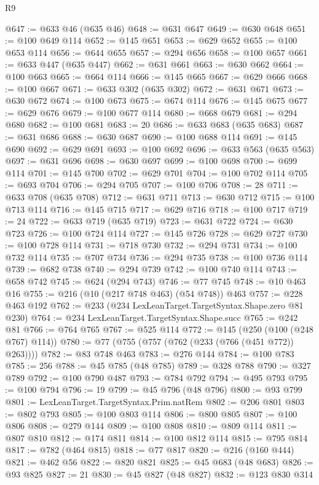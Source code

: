 \begin{lexlean}{R9}
\begin{coremodule}
@647 := @633 @46 (@635 @46)
@648 := @631 @647
@649 := @630 @648
@651 := @100 @649 @114
@652 := @145 @651
@653 := @629 @652
@655 := @100 @653 @114
@656 := @644 @655
@657 := @294 @656
@658 := @100 @657
@661 := @633 @447 (@635 @447)
@662 := @631 @661
@663 := @630 @662
@664 := @100 @663
@665 := @664 @114
@666 := @145 @665
@667 := @629 @666
@668 := @100 @667
@671 := @633 @302 (@635 @302)
@672 := @631 @671
@673 := @630 @672
@674 := @100 @673
@675 := @674 @114
@676 := @145 @675
@677 := @629 @676
@679 := @100 @677 @114
@680 := @668 @679
@681 := @294 @680
@682 := @100 @681
@683 := 20
@686 := @633 @683 (@635 @683)
@687 := @631 @686
@688 := @630 @687
@690 := @100 @688 @114
@691 := @145 @690
@692 := @629 @691
@693 := @100 @692
@696 := @633 @563 (@635 @563)
@697 := @631 @696
@698 := @630 @697
@699 := @100 @698
@700 := @699 @114
@701 := @145 @700
@702 := @629 @701
@704 := @100 @702 @114
@705 := @693 @704
@706 := @294 @705
@707 := @100 @706
@708 := 28
@711 := @633 @708 (@635 @708)
@712 := @631 @711
@713 := @630 @712
@715 := @100 @713 @114
@716 := @145 @715
@717 := @629 @716
@718 := @100 @717
@719 := 24
@722 := @633 @719 (@635 @719)
@723 := @631 @722
@724 := @630 @723
@726 := @100 @724 @114
@727 := @145 @726
@728 := @629 @727
@730 := @100 @728 @114
@731 := @718 @730
@732 := @294 @731
@734 := @100 @732 @114
@735 := @707 @734
@736 := @294 @735
@738 := @100 @736 @114
@739 := @682 @738
@740 := @294 @739
@742 := @100 @740 @114
@743 := @658 @742
@745 := @624 (@294 @743)
@746 := @77 @745
@748 := @10 @463 @16
@755 := @216 (@10 (@217 @748 @463) (@54 @748)) @463
@757 := @228 @463 @192
@762 := @233 (@234 LexLeanTarget.TargetSyntax.Shape.zero @81 @230)
@764 := @234 LexLeanTarget.TargetSyntax.Shape.succ
@765 := @242 @81
@766 := @764 @765
@767 := @525 @114
@772 := @145 (@250 (@100 (@248 @767) @114))
@780 := @77 (@755 (@757 (@762 (@233 (@766 (@451 @772)) @263))))
@782 := @83 @748 @463
@783 := @276 @144
@784 := @100 @783
@785 := 256
@788 := @45 @785 (@48 @785)
@789 := @328 @788
@790 := @327 @789
@792 := @100 @790 @487
@793 := @784 @792
@794 := @495 @793
@795 := @100 @794
@796 := 19
@799 := @45 @796 (@48 @796)
@800 := @93 @799
@801 := LexLeanTarget.TargetSyntax.Prim.natRem
@802 := @206 @801
@803 := @802 @793
@805 := @100 @803 @114
@806 := @800 @805
@807 := @100 @806
@808 := @279 @144
@809 := @100 @808
@810 := @809 @114
@811 := @807 @810
@812 := @174 @811
@814 := @100 @812 @114
@815 := @795 @814
@817 := @782 (@464 @815)
@818 := @77 @817
@820 := @216 (@160 @444)
@821 := @462 @56
@822 := @820 @821
@825 := @45 @683 (@48 @683)
@826 := @93 @825
@827 := 21
@830 := @45 @827 (@48 @827)
@832 := @123 @830 @314

\end{coremodule}
\end{lexlean}
